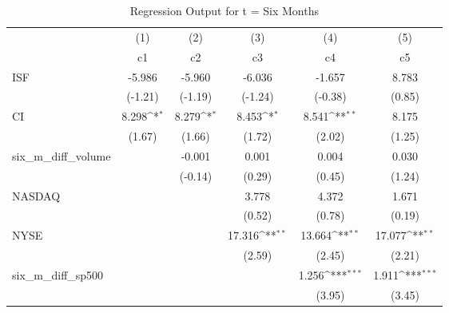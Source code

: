 \begin{table}[htbp]\centering
\def\sym#1{\ifmmode^{#1}\else\(^{#1}\)\fi}
\caption{Regression Output for t = Six Months}
\begin{tabular}{l*{5}{c}}
\hline\hline
            &\multicolumn{1}{c}{(1)}         &\multicolumn{1}{c}{(2)}         &\multicolumn{1}{c}{(3)}         &\multicolumn{1}{c}{(4)}         &\multicolumn{1}{c}{(5)}         \\
            &          c1         &          c2         &          c3         &          c4         &          c5         \\
\hline
ISF         &      -5.986         &      -5.960         &      -6.036         &      -1.657         &       8.783         \\
            &     (-1.21)         &     (-1.19)         &     (-1.24)         &     (-0.38)         &      (0.85)         \\
[1em]
CI          &       8.298\sym{*}  &       8.279\sym{*}  &       8.453\sym{*}  &       8.541\sym{**} &       8.175         \\
            &      (1.67)         &      (1.66)         &      (1.72)         &      (2.02)         &      (1.25)         \\
[1em]
six\_m\_diff\_volume&                     &      -0.001         &       0.001         &       0.004         &       0.030         \\
            &                     &     (-0.14)         &      (0.29)         &      (0.45)         &      (1.24)         \\
[1em]
NASDAQ      &                     &                     &       3.778         &       4.372         &       1.671         \\
            &                     &                     &      (0.52)         &      (0.78)         &      (0.19)         \\
[1em]
NYSE        &                     &                     &      17.316\sym{**} &      13.664\sym{**} &      17.077\sym{**} \\
            &                     &                     &      (2.59)         &      (2.45)         &      (2.21)         \\
[1em]
six\_m\_diff\_sp500&                     &                     &                     &       1.256\sym{***}&       1.911\sym{***}\\
            &                     &                     &                     &      (3.95)         &      (3.45)         \\

\end{tabular}
\end{table}
